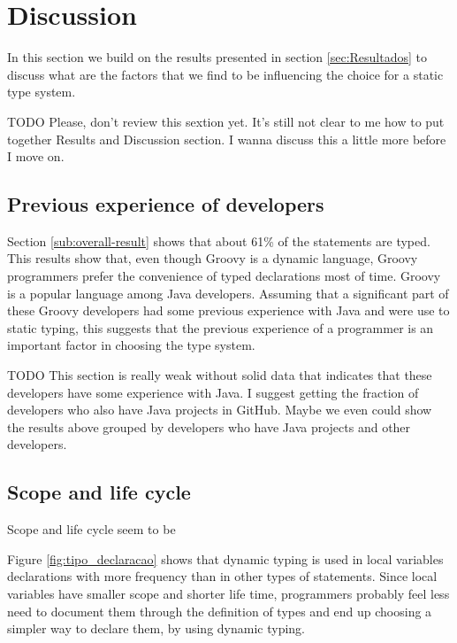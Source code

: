 \documentclass[preprint]{sigplanconf}
\begin{document}
%
%

\section{Discussion\label{sec:Discussion}}

In this section we build on the results presented in section \ref{sec:Resultados} to discuss what are the factors that we find to be influencing the choice for a static type system.


TODO Please, don't review this sextion yet. It's still not clear to me how to put together Results and Discussion section. I wanna discuss this a little more before I move on. 

\subsection{Previous experience of developers\label{sub:previous_experience}}
Section \ref{sub:overall-result} shows that about 61\% of the statements are typed. 
This results show that, even though Groovy is a dynamic language, Groovy programmers prefer the convenience of typed declarations most of time.
Groovy is a popular language among Java developers.
Assuming that a significant part of these Groovy developers had some previous experience with Java and were use to static typing, this suggests that the previous experience of a programmer is an important factor in choosing the type system.

TODO This section is really weak without solid data that indicates that these developers have some experience with Java. I suggest getting the fraction of developers who also have Java projects in GitHub. Maybe we even could show the results above grouped by developers who have Java projects and other developers.

\subsection{Scope and life cycle\label{sub:scope_lifecycle}}
Scope and life cycle seem to be 

Figure \ref{fig:tipo_declaracao} shows that dynamic typing is used in local variables declarations with more frequency than in other types of statements.
Since local variables have smaller scope and shorter life time, programmers probably feel less need to document them through the definition of types and end up choosing a simpler way to declare them, by using dynamic typing.
\end{document}
